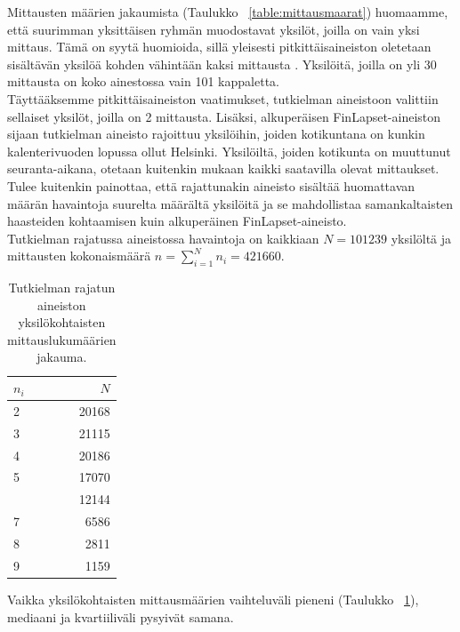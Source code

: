 \documentclass[finnish]{docopts}
\begin{document}
Mittausten määrien jakaumista (Taulukko ~\ref{table:mittausmaarat}) huomaamme, että suurimman yksittäisen ryhmän muodostavat yksilöt, joilla on vain yksi mittaus. Tämä on syytä huomioida, sillä yleisesti pitkittäisaineiston oletetaan sisältävän yksilöä kohden vähintään kaksi mittausta \cite{west14}. Yksilöitä, joilla on yli 30 mittausta on koko ainestossa vain 101 kappaletta.\\

Täyttääksemme pitkittäisaineiston vaatimukset, tutkielman aineistoon valittiin sellaiset yksilöt, joilla on 2 mittausta. Lisäksi, alkuperäisen FinLapset-aineiston sijaan tutkielman aineisto rajoittuu yksilöihin, joiden kotikuntana on kunkin kalenterivuoden lopussa ollut Helsinki. Yksilöiltä, joiden kotikunta on muuttunut seuranta-aikana, otetaan kuitenkin mukaan kaikki saatavilla olevat mittaukset.\\

Tulee kuitenkin painottaa, että rajattunakin aineisto sisältää huomattavan määrän havaintoja suurelta määrältä yksilöitä ja se mahdollistaa samankaltaisten haasteiden kohtaamisen kuin alkuperäinen FinLapset-aineisto.\\

Tutkielman rajatussa aineistossa havaintoja on kaikkiaan $N = 101239$ yksilöltä ja mittausten kokonaismäärä $n = \sum\limits_{i = 1}^{N} n_{i} = 421660$. \\

\begin{table}[ht]
\centering
\begin{tabular}{lr}
\toprule
$n_i$ & $N$\\
\midrule
2 & 20168\\
3 & 21115\\
4 & 20186\\
5 & 17070\\
\addlinespace
6 & 12144\\
7 & 6586\\
8 & 2811\\
9 & 1159\\
\bottomrule
\end{tabular}
\caption{Tutkielman rajatun aineiston yksilökohtaisten mittauslukumäärien jakauma.}
\label{table:mittausmaaratrajattu}
\end{table}

Vaikka yksilökohtaisten mittausmäärien vaihteluväli pieneni (Taulukko ~\ref{table:mittausmaaratrajattu}), mediaani ja kvartiiliväli pysyivät samana. \\
\end{document}
